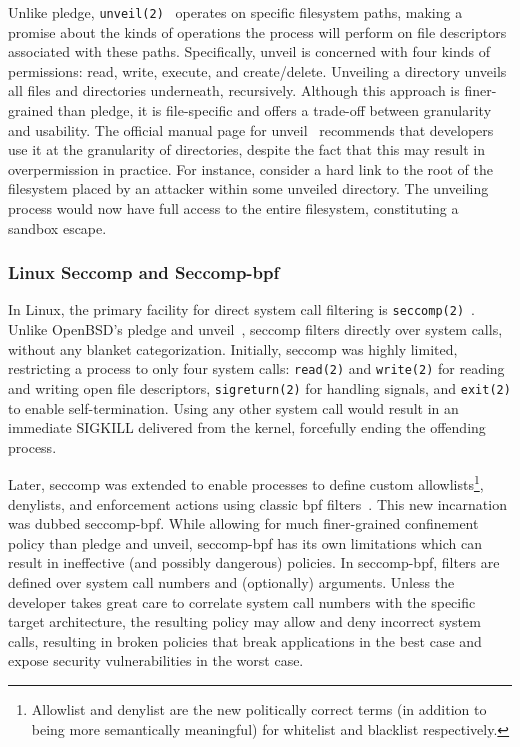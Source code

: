 \documentclass[
  fontsize=12pt,
  titlepage=firstiscover,
  paper=letter,
oneside,
  cleardoublepage=plain,
  parskip=half-,
  DIV=10,
  parindent,
  appendixprefix,
  chapterprefix,
  listof=totoc,
]{scrbook}
\begin{document}
Unlike pledge, \texttt{unveil(2)}~\cite{unveil, corbet2018_unveil} operates on specific
filesystem paths, making a promise about the kinds of operations the process will perform
on file descriptors associated with these paths. Specifically, unveil is concerned with
four kinds of permissions: read, write, execute, and create/delete. Unveiling a directory
unveils all files and directories underneath, recursively. Although this approach is
finer-grained than pledge, it is file-specific and offers a trade-off between granularity
and usability. The official manual page for unveil~\cite{unveil} recommends that
developers use it at the granularity of directories, despite the fact that this may result
in overpermission in practice. For instance, consider a hard link to the root of the
filesystem placed by an attacker within some unveiled directory. The unveiling process
would now have full access to the entire filesystem, constituting a sandbox escape.

\subsubsection*{Linux Seccomp and Seccomp-bpf}\label{sss:seccomp}

In Linux, the primary facility for direct system call filtering is
\texttt{seccomp(2)}~\cite{anderson2017_comparison, seccomp, prctl, edge2015_seccomp}.
Unlike OpenBSD's pledge and unveil~\cite{pledge, unveil}, seccomp filters directly over
system calls, without any blanket categorization. Initially, seccomp was highly limited,
restricting a process to only four system calls: \texttt{read(2)} and \texttt{write(2)}
for reading and writing open file descriptors, \texttt{sigreturn(2)} for handling signals,
and \texttt{exit(2)} to enable self-termination. Using any other system call would result
in an immediate SIGKILL delivered from the kernel, forcefully ending the offending
process.

Later, seccomp was extended to enable processes to define custom
allowlists\footnote{Allowlist and denylist are the new politically correct terms (in
addition to being more semantically meaningful) for whitelist and blacklist
respectively.}, denylists, and enforcement actions using classic \gls{bpf}
filters~\cite{edge2015_seccomp}. This new incarnation was dubbed seccomp-bpf.  While
allowing for much finer-grained confinement policy than pledge and unveil, seccomp-bpf has
its own limitations which can result in ineffective (and possibly dangerous) policies. In
seccomp-bpf, filters are defined over system call numbers and (optionally) arguments.
Unless the developer takes great care to correlate system call numbers with the specific
target architecture, the resulting policy may allow and deny incorrect system calls,
resulting in broken policies that break applications in the best case and expose security
vulnerabilities in the worst case.
\end{document}
